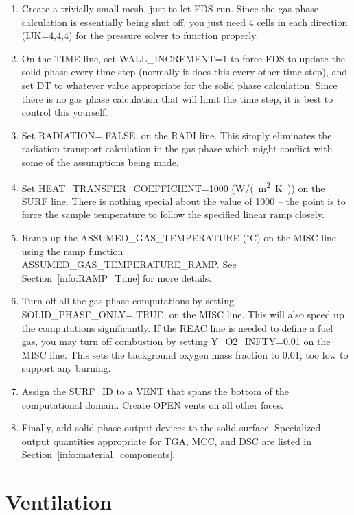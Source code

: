 \documentclass[11pt]{book}
\begin{document}
\begin{enumerate}
\item Create a trivially small mesh, just to let FDS run. Since the
gas phase calculation is essentially being shut off, you just need 4
cells in each direction ({\ct IJK=4,4,4}) for the pressure solver to
function properly.
\item On the {\ct TIME} line, set {\ct WALL\_INCREMENT=1} to force FDS
to update the solid phase every time step (normally it does this every
other time step), and set {\ct DT} to whatever value appropriate for
the solid phase calculation. Since there is no gas phase calculation
that will limit the time step, it is best to control this yourself.
\item Set {\ct RADIATION=.FALSE.} on the {\ct RADI} line. This simply eliminates the radiation transport calculation in the gas phase which might conflict with some of the assumptions being made.
\item Set {\ct HEAT\_TRANSFER\_COEFFICIENT=1000} (\si{W/(m^2.K)}) on the {\ct SURF} line. There is nothing special about the value of 1000 -- the point is to force the sample temperature to follow the specified linear ramp closely.
\item Ramp up the {\ct ASSUMED\_GAS\_TEMPERATURE} ($^\circ$C) on the {\ct MISC} line using the ramp function \\ {\ct ASSUMED\_GAS\_TEMPERATURE\_RAMP}. See Section~\ref{info:RAMP_Time} for more details.
\item Turn off all the gas phase computations by setting {\ct SOLID\_PHASE\_ONLY=.TRUE.} on the {\ct MISC} line. This will also speed up the computations significantly. If the {\ct REAC} line is needed to define a fuel gas, you may turn off combustion by setting {\ct Y\_O2\_INFTY=0.01} on the {\ct MISC} line. This sets the background oxygen mass fraction to 0.01, too low to support any burning.
\item Assign the {\ct SURF\_ID} to a {\ct VENT} that spans the bottom
of the computational domain. Create {\ct OPEN} vents on all other
faces.
\item Finally, add solid phase output devices to the solid surface. Specialized output quantities appropriate for TGA, MCC, and DSC are listed in Section~\ref{info:material_components}.
\end{enumerate}





\chapter{Ventilation}
\end{document}
